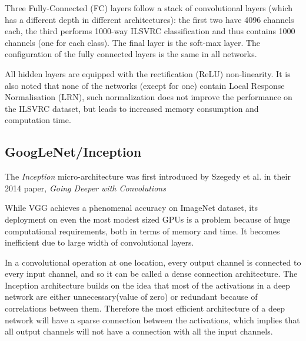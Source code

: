 Three Fully-Connected (FC) layers follow a stack of convolutional layers (which has a different depth in different architectures): the first two have 4096 channels each, the third performs 1000-way ILSVRC classification and thus contains 1000 channels (one for each class). The final layer is the soft-max layer. The configuration of the fully connected layers is the same in all networks.

All hidden layers are equipped with the rectification (ReLU) non-linearity. It is also noted that none of the networks (except for one) contain Local Response Normalisation (LRN), such normalization does not improve the performance on the ILSVRC dataset, but leads to increased memory consumption and computation time.

\subsection{GoogLeNet/Inception}
The \textit{Inception} micro-architecture was first introduced by Szegedy et al. in their 2014 paper, \textit{Going Deeper with Convolutions} \cite{szegedy2015going}

While VGG achieves a phenomenal accuracy on ImageNet dataset, its deployment on even the most modest sized GPUs is a problem because of huge computational requirements, both in terms of memory and time. It becomes inefficient due to large width of convolutional layers.

In a convolutional operation at one location, every output channel is connected to every input channel, and so it can be called a dense connection architecture. The Inception architecture builds on the idea that most of the activations in a deep network are either unnecessary(value of zero) or redundant because of correlations between them. Therefore the most efficient architecture of a deep network will have a sparse connection between the activations, which implies that all output channels will not have a connection with all the input channels.

